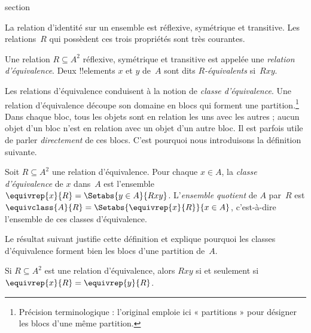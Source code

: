 \documentclass[11pt,a4paper,openany]{memoir}
\begin{document}
\endgroup



\begingroup
\expandafter\def\csname ol@sectioncs\endcsname{section}
\def\olfilename{equivalence-relations}




La relation d’identité sur un ensemble est réflexive, symétrique et
transitive. Les relations~$R$ qui possèdent ces trois propriétés sont
très courantes.

\begin{defn}
Une relation $R \subseteq A^2$ réflexive, symétrique et transitive est
appelée une \emph{relation d’équivalence}. Deux !!{element}s $x$ et $y$
de~$A$ sont dits \emph{$R$-équivalents} si~$Rxy$.
\end{defn}

Les relations d’équivalence conduisent à la notion de \emph{classe
d’équivalence}. Une relation d’équivalence découpe son domaine en blocs
qui forment une partition.\footnote{Précision terminologique : l’original
emploie ici « partitions » pour désigner les blocs d’une même partition.}
Dans chaque bloc, tous les objets sont en relation les uns avec les autres ;
aucun objet d’un bloc n’est en relation avec un objet d’un autre bloc.
Il est parfois utile de parler \emph{directement} de ces blocs.
C’est pourquoi nous introduisons la définition suivante.

\begin{defn}
Soit $R \subseteq A^2$ une relation d’équivalence. Pour chaque $x \in A$,
la \emph{classe d’équivalence} de $x$ dans~$A$ est l’ensemble
$\equivrep{x}{R} = \Setabs{y \in A}{Rxy}$. L’\emph{ensemble quotient}
de $A$ par~$R$ est $\equivclass{A}{R} = \Setabs{\equivrep{x}{R}}{x \in A}$,
c’est-à-dire l’ensemble de ces classes d’équivalence.
\end{defn}

Le résultat suivant justifie cette définition et explique pourquoi les
classes d’équivalence forment bien les blocs d’une partition de~$A$.

\begin{prop}
Si $R \subseteq A^2$ est une relation d’équivalence, alors $Rxy$ si et
seulement si $\equivrep{x}{R} = \equivrep{y}{R}$.
\end{prop}
\end{document}
